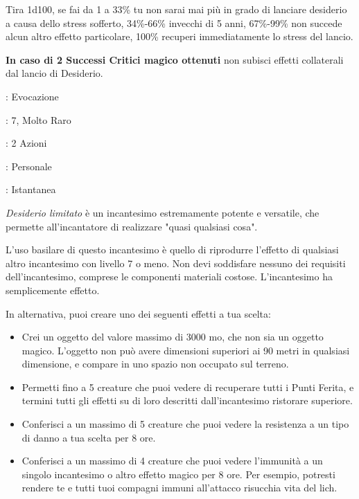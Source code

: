\begin{multicols}{2}
Tira 1d100, se fai da 1 a 33\% tu non sarai mai più in grado di lanciare desiderio a causa dello stress sofferto, 34\%-66\% invecchi di 5 anni, 67\%-99\% non succede alcun altro effetto particolare, 100\% recuperi immediatamente lo stress del lancio.

\textbf{In caso di 2 Successi Critici magico ottenuti} non subisci effetti collaterali dal lancio di Desiderio.


\noindent\colorbox{OBSSgold!10}{
\begin{minipage}{0.95\linewidth}
\begin{description}[noitemsep, topsep=0pt, parsep=0pt, partopsep=0pt, leftmargin=0cm, labelwidth=1.3cm]
	\item[\textbf{Lista}]: Evocazione
	\item[\textbf{Livello}]: 7, Molto Raro
	\item[\textbf{Lancio}]: 2 Azioni
	\item[\textbf{Gittata}]: Personale
	\item[\textbf{Durata}]: Istantanea
\end{description}
\end{minipage}}\smallskip

\emph{Desiderio limitato} è un incantesimo estremamente potente e versatile, che permette all'incantatore di realizzare "quasi qualsiasi cosa".

L'uso basilare di questo incantesimo è quello di riprodurre l'effetto di qualsiasi altro incantesimo con livello 7 o meno. Non devi soddisfare nessuno dei requisiti dell'incantesimo, comprese le componenti materiali costose. L'incantesimo ha semplicemente effetto.

In alternativa, puoi creare uno dei seguenti effetti a tua scelta:

\begin{itemize}[leftmargin=*] \setlength{\itemsep}{0pt}
	\item Crei un oggetto del valore massimo di 3000 mo, che non sia un oggetto magico. L'oggetto non può avere dimensioni superiori ai 90 metri in qualsiasi dimensione, e compare in uno spazio non occupato sul terreno.
	\item Permetti fino a 5 creature che puoi vedere di recuperare tutti i Punti Ferita, e termini tutti gli effetti su di loro descritti dall'incantesimo ristorare superiore.
	\item Conferisci a un massimo di 5 creature che puoi vedere la resistenza a un tipo di danno a tua scelta per 8 ore.
	\item Conferisci a un massimo di 4 creature che puoi vedere l'immunità a un singolo incantesimo o altro effetto magico per 8 ore. Per esempio, potresti rendere te e tutti tuoi compagni immuni all'attacco risucchia vita del lich.
\end{itemize}


\end{multicols}
